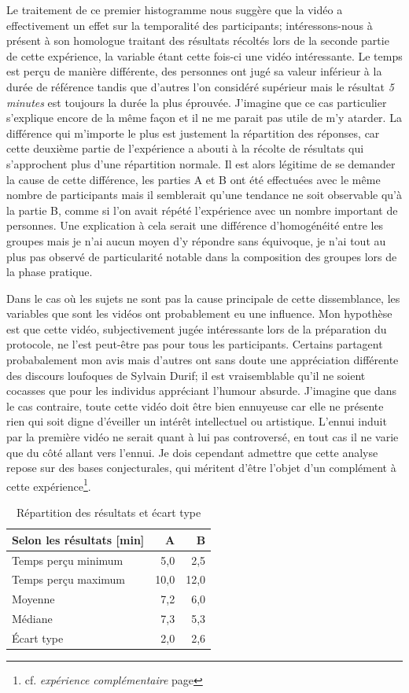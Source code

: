 \documentclass[12pt,fleqn,oneside,french,openany]{book} %
\begin{document}
Le traitement de ce premier histogramme nous suggère que la vidéo a effectivement un effet sur la temporalité des participants; intéressons-nous à présent à son homologue traitant des résultats récoltés lors de la seconde partie de cette expérience, la variable étant cette fois-ci une vidéo intéressante. Le temps est perçu de manière différente, des personnes ont jugé sa valeur inférieur à la durée de référence tandis que d'autres l'on considéré supérieur mais le résultat \emph{5 minutes} est toujours la durée la plus éprouvée. J'imagine que ce cas particulier s'explique encore de la même façon et il ne me parait pas utile de m'y atarder. La différence qui m'importe le plus est justement la répartition des réponses, car cette deuxième partie de l'expérience a abouti à la récolte de résultats qui s'approchent plus d'une répartition normale. Il est alors légitime de se demander la cause de cette différence, les parties A et B ont été effectuées avec le même nombre de participants mais il semblerait qu'une tendance ne soit observable qu'à la partie B, comme si l'on avait répété l'expérience avec un nombre important de personnes. Une explication à cela serait une différence d'homogénéité entre les groupes mais je n'ai aucun moyen d'y répondre sans équivoque, je n'ai tout au plus pas observé de particularité notable dans la composition des groupes lors de la phase pratique. 

Dans le cas où les sujets ne sont pas la cause principale de cette dissemblance, les variables que sont les vidéos ont probablement eu une influence. Mon hypothèse est que cette vidéo, subjectivement jugée intéressante lors de la préparation du protocole, ne l'est peut-être pas pour tous les participants. Certains partagent probabalement mon avis mais d'autres ont sans doute une appréciation différente des discours loufoques de Sylvain Durif; il est vraisemblable qu'il ne soient cocasses que pour les individus appréciant l'humour absurde. J'imagine que dans le cas contraire, toute cette vidéo doit être bien ennuyeuse car elle ne présente rien qui soit digne d'éveiller un intérêt intellectuel ou artistique. L'ennui induit par la première vidéo ne serait quant à lui pas controversé, en tout cas il ne varie que du côté allant vers l'ennui. Je dois cependant admettre que cette analyse repose sur des bases conjecturales, qui méritent d'être l'objet d'un complément à cette expérience\footnote{cf. \emph{expérience complémentaire} page \pageref{ssec:exp1.2}}. 

\begin{table}[h!]
	\centering
	\caption{Répartition des résultats et écart type} \label{tbl:analyse1.1}
	\begin{tabular}{lrr}
		\toprule 
		\textbf{Selon les résultats [min]} & \textbf{A} & \textbf{B} \\ \midrule
		Temps perçu minimum & 5,0 & 2,5 \\ 
		Temps perçu maximum & 10,0 & 12,0 \\
		Moyenne & 7,2 & 6,0 \\
		Médiane & 7,3 & 5,3 \\
		Écart type & 2,0 & 2,6 \\ \bottomrule
	\end{tabular}
\end{table}
\end{document}
